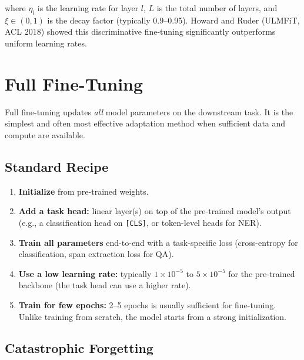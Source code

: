 where $\eta_l$ is the learning rate for layer $l$, $L$ is the total number of
layers, and $\xi \in (0, 1)$ is the decay factor (typically 0.9--0.95).
Howard and Ruder (ULMFiT, ACL 2018) showed this discriminative fine-tuning
significantly outperforms uniform learning rates.


\section{Full Fine-Tuning}
\label{sec:full-finetuning}

Full fine-tuning updates \emph{all} model parameters on the downstream task.
It is the simplest and often most effective adaptation method when sufficient
data and compute are available.

\subsection{Standard Recipe}

\begin{enumerate}
    \item \textbf{Initialize} from pre-trained weights.
    \item \textbf{Add a task head:} linear layer(s) on top of the pre-trained
          model's output (e.g., a classification head on \texttt{[CLS]}, or
          token-level heads for NER).
    \item \textbf{Train all parameters} end-to-end with a task-specific loss
          (cross-entropy for classification, span extraction loss for QA).
    \item \textbf{Use a low learning rate:} typically $1 \times 10^{-5}$ to
          $5 \times 10^{-5}$ for the pre-trained backbone (the task head can
          use a higher rate).
    \item \textbf{Train for few epochs:} 2--5 epochs is usually sufficient for
          fine-tuning.  Unlike training from scratch, the model starts from a
          strong initialization.
\end{enumerate}

\subsection{Catastrophic Forgetting}
\label{sec:catastrophic-forgetting}

